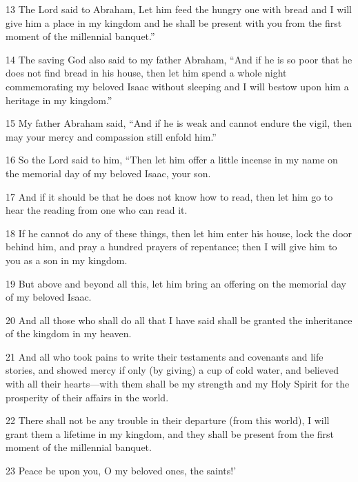 \par 13 The Lord said to Abraham, Let him feed the hungry one with bread and I will give him a place in my kingdom and he shall be present with you from the first moment of the millennial banquet.” 

\par 14 The saving God also said to my father Abraham, “And if he is so poor that he does not find bread in his house, then let him spend a whole night commemorating my beloved Isaac without sleeping and I will bestow upon him a heritage in my kingdom.” 

\par 15 My father Abraham said, “And if he is weak and cannot endure the vigil, then may your mercy and compassion still enfold him.” 

\par 16 So the Lord said to him, “Then let him offer a little incense in my name on the memorial day of my beloved Isaac, your son. 

\par 17 And if it should be that he does not know how to read, then let him go to hear the reading from one who can read it. 

\par 18 If he cannot do any of these things, then let him enter his house, lock the door behind him, and pray a hundred prayers of repentance; then I will give him to you as a son in my kingdom. 

\par 19 But above and beyond all this, let him bring an offering on the memorial day of my beloved Isaac. 

\par 20 And all those who shall do all that I have said shall be granted the inheritance of the kingdom in my heaven. 

\par 21 And all who took pains to write their testaments and covenants and life stories, and showed mercy if only (by giving) a cup of cold water, and believed with all their hearts—with them shall be my strength and my Holy Spirit for the prosperity of their affairs in the world. 

\par 22 There shall not be any trouble in their departure (from this world), I will grant them a lifetime in my kingdom, and they shall be present from the first moment of the millennial banquet. 

\par 23 Peace be upon you, O my beloved ones, the saints!’ 

